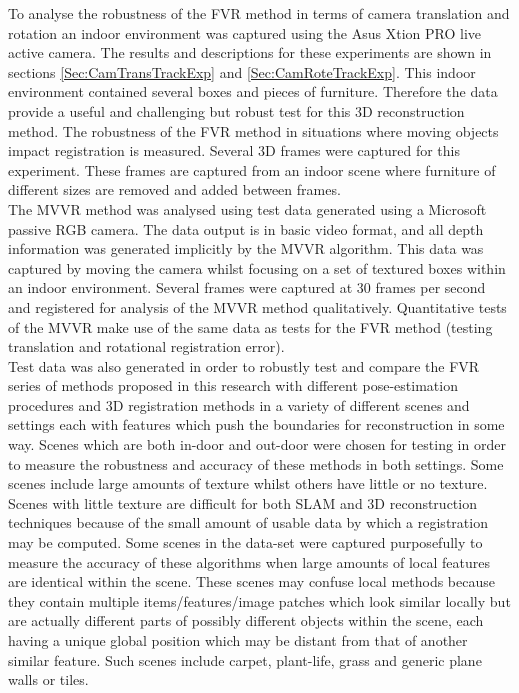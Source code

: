  

To analyse the robustness of the FVR method in terms of camera translation and rotation an indoor environment was captured using the Asus Xtion PRO live active camera. The results and descriptions for these experiments are shown in sections \ref{Sec:CamTransTrackExp} and \ref{Sec:CamRoteTrackExp}. This indoor environment contained several boxes and pieces of furniture. Therefore the data provide a useful and challenging but robust test for this 3D reconstruction method. The robustness of the FVR method in situations where moving objects impact registration is measured. Several 3D frames were captured for this experiment. These frames are captured from an indoor scene where furniture of different sizes are removed and added between frames. \\



The MVVR method was analysed using test data generated using a Microsoft passive RGB camera. The data output is in basic video format, and all depth information was generated implicitly by the MVVR algorithm. This data was captured by moving the camera whilst focusing on a set of textured boxes within an indoor environment. Several frames were captured at 30 frames per second and registered for analysis of the MVVR method qualitatively. Quantitative tests of the MVVR make use of the same data as tests for the FVR method (testing translation and rotational registration error). \\

Test data was also generated in order to robustly test and compare the FVR series of methods proposed in this research with different pose-estimation procedures and 3D registration methods in a variety of different scenes and settings each with features which push the boundaries for reconstruction in some way. Scenes which are both in-door and out-door were chosen for testing in order to measure the robustness and accuracy of these methods in both settings. Some scenes include large amounts of texture whilst others have little or no texture. Scenes with little texture are difficult for both SLAM and 3D reconstruction techniques because of the small amount of usable data by which a registration may be computed. Some scenes in the data-set were captured purposefully to measure the accuracy of these algorithms when large amounts of local features are identical within the scene. These scenes may confuse local methods because they contain multiple items/features/image patches which look similar locally but are actually different parts of possibly different objects within the scene, each having a unique global position which may be distant from that of another similar feature. Such scenes include carpet, plant-life, grass and generic plane walls or tiles. \\

